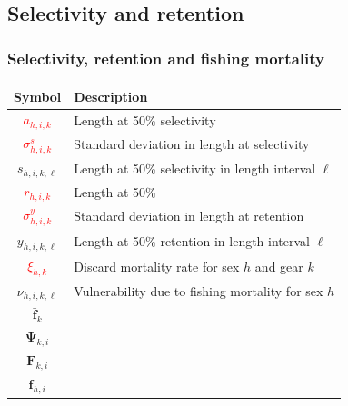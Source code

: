 \documentclass{beamer}
\begin{document}
\subsection{Selectivity and retention}
\begin{frame}
\frametitle{Selectivity, retention and fishing mortality}
\begin{table}
  \centering
  \begin{tabular}{cl}
  \hline
  Symbol  & Description \\
  \hline
      \textcolor{red}{$a_{h,i,k}$} & Length at 50\% selectivity \\
      \textcolor{red}{$\sigma^s_{h,i,k}$} & Standard deviation in length at selectivity \\
      $s_{h,i,k,\ell}$ & Length at 50\% selectivity in length interval $\ell$ \\
      \textcolor{red}{$r_{h,i,k}$} & Length at 50\% \\
      \textcolor{red}{$\sigma^y_{h,i,k}$} & Standard deviation in length at retention \\
      $y_{h,i,k,\ell}$ & Length at 50\% retention in length interval $\ell$ \\
      \textcolor{red}{$\xi_{h,k}$} & Discard mortality rate for sex $h$ and gear $k$ \\
      $\nu_{h,i,k,\ell}$ & Vulnerability due to fishing mortality for sex $h$ \\
      $\bar{\boldsymbol{f}}_k$ &  \\
      $\boldsymbol\Psi_{k,i}$ &  \\
      $\boldsymbol{F}_{k,i}$ &  \\
      $\boldsymbol{f}_{h,i}$ &  \\
  \hline
  \end{tabular}
\end{table}
\end{frame}

\end{document}
